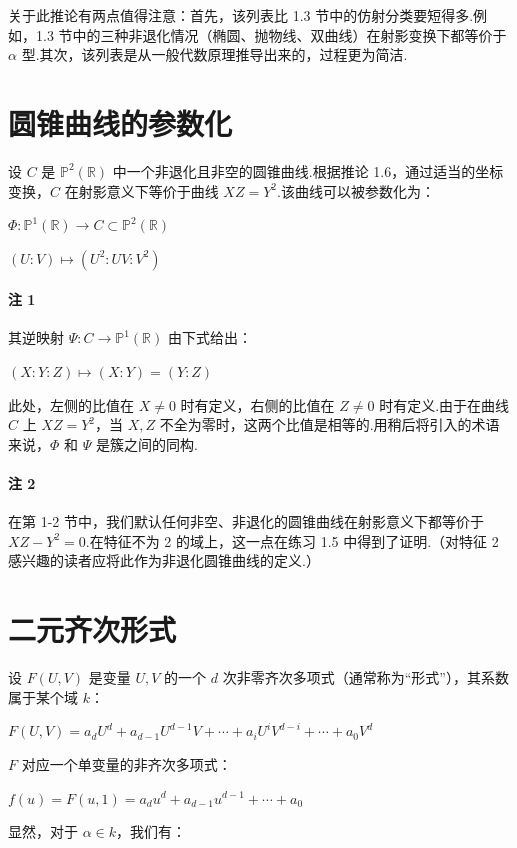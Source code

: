 关于此推论有两点值得注意：首先，该列表比 1.3 节中的仿射分类要短得多.例如，1.3 节中的三种非退化情况（椭圆、抛物线、双曲线）在射影变换下都等价于 \(\alpha\) 型.其次，该列表是从一般代数原理推导出来的，过程更为简洁.

\section{圆锥曲线的参数化}

设 \(C\) 是 \(\mathbb{P}^2(\mathbb{R})\) 中一个非退化且非空的圆锥曲线.根据推论 1.6，通过适当的坐标变换，\(C\) 在射影意义下等价于曲线 \(XZ = Y^2\).该曲线可以被参数化为：

\(
\Phi: \mathbb{P}^1(\mathbb{R}) \to C \subset \mathbb{P}^2(\mathbb{R})
\)

\(
(U:V) \mapsto (U^2 : UV : V^2)
\)
\paragraph{注 1} 其逆映射 \(\Psi: C \to \mathbb{P}^1(\mathbb{R})\) 由下式给出：

\(
(X:Y:Z) \mapsto (X:Y) = (Y:Z)
\)

此处，左侧的比值在 \(X \neq 0\) 时有定义，右侧的比值在 \(Z \neq 0\) 时有定义.由于在曲线 \(C\) 上 \(XZ=Y^2\)，当 \(X,Z\) 不全为零时，这两个比值是相等的.用稍后将引入的术语来说，\(\Phi\) 和 \(\Psi\) 是簇之间的同构.

\paragraph{注 2} 在第 1-2 节中，我们默认任何非空、非退化的圆锥曲线在射影意义下都等价于 \(XZ - Y^2 = 0\).在特征不为 2 的域上，这一点在练习 1.5 中得到了证明.（对特征 2 感兴趣的读者应将此作为非退化圆锥曲线的定义.）

\section{二元齐次形式}

设 \(F(U,V)\) 是变量 \(U,V\) 的一个 \(d\) 次非零齐次多项式（通常称为“形式”），其系数属于某个域 \(k\)：

\(
F(U,V) = a_d U^d + a_{d-1} U^{d-1}V + \cdots + a_i U^i V^{d-i} + \cdots + a_0 V^d
\)

\(F\) 对应一个单变量的非齐次多项式：

\(
f(u) = F(u,1) = a_d u^d + a_{d-1} u^{d-1} + \cdots + a_0
\)

显然，对于 \(\alpha \in k\)，我们有：


